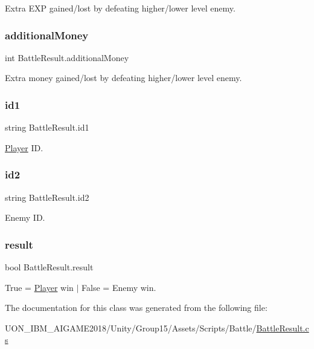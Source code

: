 Extra E\+XP gained/lost by defeating higher/lower level enemy. 

\mbox{\label{class_battle_result_a41b75012dae886cb26753404c5ff9dcd}} 
\subsubsection{\texorpdfstring{additionalMoney}{additionalMoney}}
{\footnotesize\ttfamily int Battle\+Result.\+additional\+Money}



Extra money gained/lost by defeating higher/lower level enemy. 

\mbox{\label{class_battle_result_a350ad6a31cf445647adc770788444832}} 
\subsubsection{\texorpdfstring{id1}{id1}}
{\footnotesize\ttfamily string Battle\+Result.\+id1}



\mbox{\hyperlink{class_player}{Player}} ID. 

\mbox{\label{class_battle_result_ae2c787e74297c842bf4e284f0cc612fb}} 
\subsubsection{\texorpdfstring{id2}{id2}}
{\footnotesize\ttfamily string Battle\+Result.\+id2}



Enemy ID. 

\mbox{\label{class_battle_result_afd1e0eda93aa975e42f89c2eb3ce0fdc}} 
\subsubsection{\texorpdfstring{result}{result}}
{\footnotesize\ttfamily bool Battle\+Result.\+result}



True = \mbox{\hyperlink{class_player}{Player}} win $\vert$ False = Enemy win. 



The documentation for this class was generated from the following file\+:\begin{DoxyCompactItemize}
\item 
U\+O\+N\+\_\+\+I\+B\+M\+\_\+\+A\+I\+G\+A\+M\+E2018/\+Unity/\+Group15/\+Assets/\+Scripts/\+Battle/\mbox{\hyperlink{_battle_result_8cs}{Battle\+Result.\+cs}}\end{DoxyCompactItemize}
